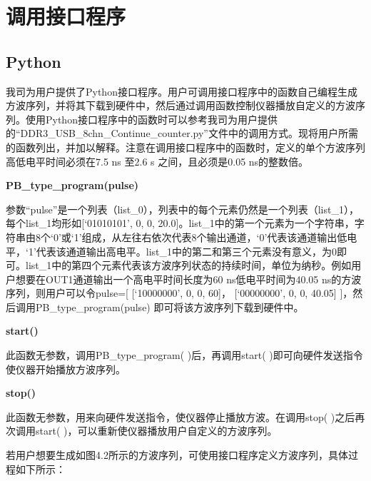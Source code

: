 \chapter{\heiti 调用接口程序}
\section{Python }
我司为用户提供了Python接口程序。用户可调用接口程序中的函数自己编程生成方波序列，并将其下载到硬件中，然后通过调用函数控制仪器播放自定义的方波序列。使用Python接口程序中的函数时可以参考我司为用户提供的“DDR3\_USB\_8chn\_Continue\_counter.py”文件中的调用方式。现将用户所需的函数列出，并加以解释。注意在调用接口程序中的函数时，定义的单个方波序列高低电平时间必须在7.5 ns 至2.6 s 之间，且必须是0.05 ns的整数倍。
\vspace{0.4cm}

\noindent\fontsize{12pt}{\baselineskip}\textbf{PB\_type\_program(pulse)}

参数“pulse”是一个列表（list\_0），列表中的每个元素仍然是一个列表（list\_1），每个list\_1均形如[`01010101', { }0, { }0, { }20.0]。list\_1中的第一个元素为一个字符串，字符串由8个‘0’或‘1’组成，从左往右依次代表8个输出通道，‘0’代表该通道输出低电平，‘1’代表该通道输出高电平。list\_1中的第二和第三个元素没有意义，为0即可。list\_1中的第四个元素代表该方波序列状态的持续时间，单位为纳秒。例如用户想要在OUT1通道输出一个高电平时间长度为60 ns低电平时间为40.05 ns的方波序列，则用户可以令pulse=[{ }[`10000000', { }0, { }0, { }60]， [`00000000', { }0, { }0, { }40.05]{ }]，然后调用PB\_type\_program(pulse) 即可将该方波序列下载到硬件中。
\vspace{0.4cm}

\noindent\fontsize{12pt}{\baselineskip}\textbf{start()}

此函数无参数，调用PB\_type\_program( )后，再调用start( )即可向硬件发送指令使仪器开始播放方波序列。
\vspace{0.4cm}

\noindent\fontsize{12pt}{\baselineskip}\textbf{stop()}

此函数无参数，用来向硬件发送指令，使仪器停止播放方波。在调用stop( )之后再次调用start( )，可以重新使仪器播放用户自定义的方波序列。
\vspace{0.4cm}

\noindent\fontsize{12pt}{\baselineskip}\textbf{}

若用户想要生成如图4.2所示的方波序列，可使用接口程序定义方波序列，具体过程如下所示：


